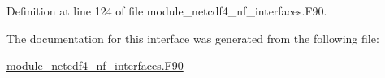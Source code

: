 Definition at line 124 of file module\+\_\+netcdf4\+\_\+nf\+\_\+interfaces.\+F90.



The documentation for this interface was generated from the following file\+:\begin{DoxyCompactItemize}
\item 
\hyperlink{module__netcdf4__nf__interfaces_8F90}{module\+\_\+netcdf4\+\_\+nf\+\_\+interfaces.\+F90}\end{DoxyCompactItemize}
